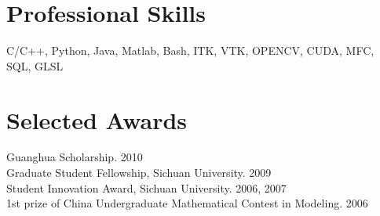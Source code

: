\documentclass[line,margin]{res}
\begin{document}
\begin{resume}
\section{\sc Professional Skills}
\smallskip

C/C++, Python, Java, Matlab, Bash, ITK, VTK, OPENCV, CUDA, MFC, SQL, GLSL
 
\section{\sc Selected Awards}


Guanghua Scholarship.  \hfill       2010\\
Graduate Student Fellowship, Sichuan University.  \hfill       2009\\
Student Innovation Award, Sichuan University.  \hfill       2006, 2007 \\%
1st prize of China Undergraduate Mathematical Contest in Modeling.  \hfill       2006



\end{resume}

%
%
\end{document}
